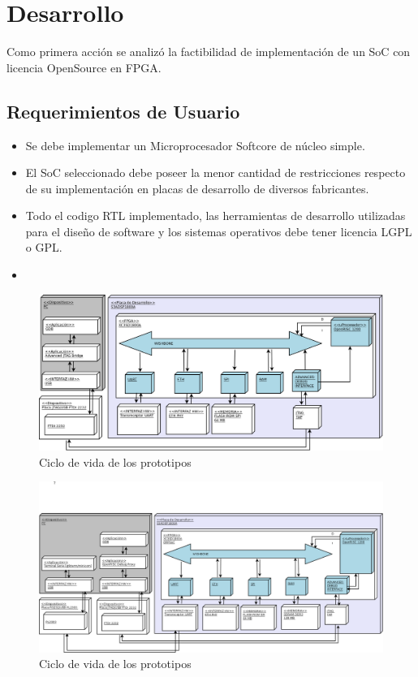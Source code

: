 \documentclass[conference]{IEEEtran}
\newcommand{\ScaleA}{1.0} %
\begin{document}
\section{Desarrollo} %
Como primera acción se analizó la factibilidad de implementación de un SoC con licencia OpenSource en FPGA.
\subsection{Requerimientos de Usuario}%
\begin{itemize}
\item Se debe implementar un Microprocesador Softcore de núcleo simple.
\item El SoC seleccionado debe poseer la menor cantidad de restricciones respecto de su implementación en placas de desarrollo de diversos fabricantes.
\item Todo el codigo RTL implementado, las herramientas de desarrollo utilizadas para el diseño de software y los sistemas operativos debe tener licencia LGPL o GPL.
\item
\end{itemize}

\begin{figure}[t] 
  \centerline{\includegraphics[width=\ScaleA\columnwidth]{figures_sources/proto1}}%
    \caption{Ciclo de vida de los prototipos}
    \label{fig:pro3enc} 
\end{figure}

\begin{figure}[t] 
  \centerline{\includegraphics[width=\ScaleA\columnwidth]{figures_sources/proto2}}%
    \caption{Ciclo de vida de los prototipos}
    \label{fig:pro3enc} 
\end{figure}
\end{document}
